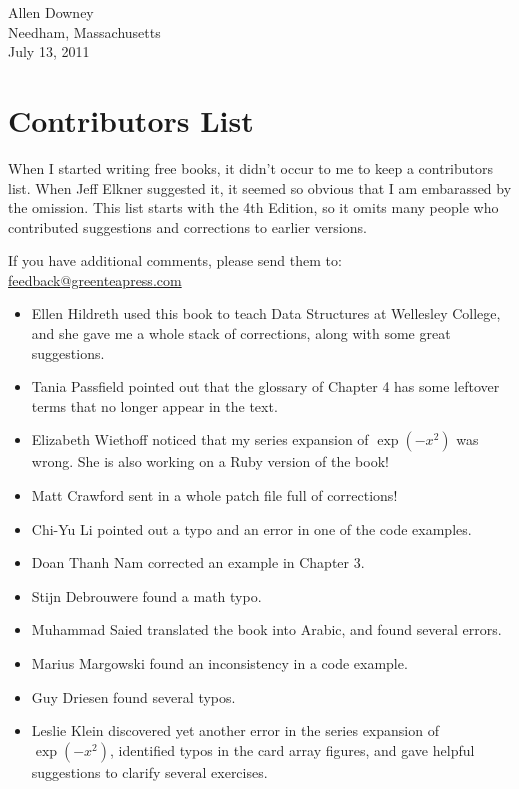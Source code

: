 \vspace{0.2in}

\begin{flushleft}
Allen Downey\\
Needham, Massachusetts\\
July 13, 2011
\end{flushleft}


\section*{Contributors List}

When I started writing free books, it didn't occur to me to keep
a contributors list.  When Jeff Elkner suggested it, it seemed so
obvious that I am embarassed by the omission.  This list starts
with the 4th Edition, so it omits many people who contributed
suggestions and corrections to earlier versions.

If you have additional comments, please send them to: \\
\href{mailto:feedback@greenteapress.com}{feedback@greenteapress.com}

\begin{itemize}

\item Ellen Hildreth used this book to teach Data Structures at
Wellesley College, and she gave me a whole stack of corrections,
along with some great suggestions.

\item Tania Passfield pointed out that the glossary of Chapter 4
has some leftover terms that no longer appear in the text.

\item Elizabeth Wiethoff noticed that my series expansion of
$\exp(-x^2)$ was wrong.  She is also working on a Ruby version of
the book!

\item Matt Crawford sent in a whole patch file full of corrections!

\item Chi-Yu Li pointed out a typo and an error in one of the code
examples.

\item Doan Thanh Nam corrected an example in Chapter 3.

\item Stijn Debrouwere found a math typo.

\item Muhammad Saied translated the book into Arabic, and found
several errors.

\item Marius Margowski found an inconsistency in a code example.

\item Guy Driesen found several typos.

\item Leslie Klein discovered yet another error in the series expansion
of $\exp(-x^2)$, identified typos in the card array figures, and gave
helpful suggestions to clarify several exercises.

\end{itemize}

